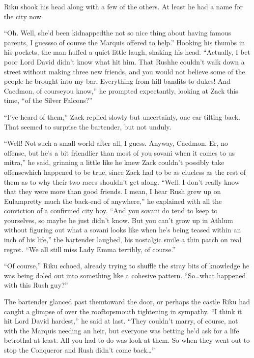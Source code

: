 Riku shook his head along with a few of the others. At least he had a name for the city now.

``Oh. Well, she'd been kidnapped\textemdash the not so nice thing about having famous parents, I guess\textemdash so of course the Marquis offered to help.'' Hooking his thumbs in his pockets, the man huffed a quiet little laugh, shaking his head. ``Actually, I bet poor Lord David didn't know what hit him. That Rush\textemdash he couldn't walk down a street without making three new friends, and you would not believe some of the people he brought into my bar. Everything from hill bandits to dukes! And Caedmon, of course\textemdash you know,'' he prompted expectantly, looking at Zack this time, ``of the Silver Falcons?''

``I've heard of them,'' Zack replied slowly but uncertainly, one ear tilting back. That seemed to surprise the bartender, but not unduly.

``Well! Not such a small world after all, I guess. Anyway, Caedmon. Er, no offense, but he's a bit friendlier than most of you sovani when it comes to us mitra,'' he said, grinning a little like he knew Zack couldn't possibly take offense\textemdash which happened to be true, since Zack had to be as clueless as the rest of them as to why their two races shouldn't get along. ``Well. I don't really know that they were more than good friends. I mean, I hear Rush grew up on Eulam\textemdash pretty much the back-end of anywhere,'' he explained with all the conviction of a confirmed city boy. ``And you sovani do tend to keep to yourselves, so maybe he just didn't know. But you can't grow up in Athlum without figuring out what a sovani looks like when he's being teased within an inch of his life,'' the bartender laughed, his nostalgic smile a thin patch on real regret. ``We all still miss Lady Emma terribly, of course.''

``Of course,'' Riku echoed, already trying to shuffle the stray bits of knowledge he was being doled out into something like a cohesive pattern. ``So\ldots what happened with this Rush guy?''

The bartender glanced past them\textemdash toward the door, or perhaps the castle Riku had caught a glimpse of over the rooftops\textemdash mouth tightening in sympathy. ``I think it hit Lord David hardest,'' he said at last. ``They couldn't marry, of course, not with the Marquis needing an heir, but everyone was betting he'd ask for a life betrothal at least. All you had to do was look at them. So when they went out to stop the Conqueror and Rush didn't come back\ldots''

